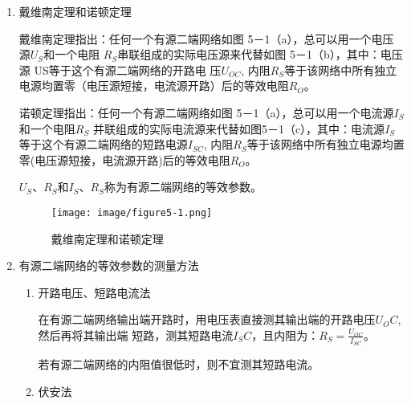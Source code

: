 \documentclass[UTF8]{article}
\begin{document}
            \begin{enumerate}[label=\textbf{\arabic*}.]
                \item 戴维南定理和诺顿定理
                \par
                \noindent\hspace{2em}戴维南定理指出：任何一个有源二端网络如图 5－1（a），总可以用一个电压源$U_S$和一个电阻
                $R_S$串联组成的实际电压源来代替如图 5－1（b），其中：电压源 US等于这个有源二端网络的开路电
                压$U_{OC}$, 内阻$R_S$等于该网络中所有独立电源均置零（电压源短接，电流源开路）后的等效电阻$R_O$。
                \par
                \noindent\hspace{2em}诺顿定理指出：任何一个有源二端网络如图 5－1（a），总可以用一个电流源$I_S$和一个电阻$R_S$
                并联组成的实际电流源来代替如图5－1（c），其中：电流源$I_S$等于这个有源二端网络的短路电源$I_{SC}$, 
                内阻$R_S$等于该网络中所有独立电源均置零(电压源短接，电流源开路)后的等效电阻$R_O$。 
                \par
                \noindent\hspace{2em}$U_S$、$R_S$和$I_S$、$R_S$称为有源二端网络的等效参数。
                \begin{figure}[H]
                    \centering
                    \texttt{[image: image/figure5-1.png]}
                    \caption{戴维南定理和诺顿定理}
                \end{figure}
                \item 有源二端网络的等效参数的测量方法
                \begin{enumerate}[label=(\textbf{\arabic*})]
                    \item 开路电压、短路电流法
                    \par
                    \noindent\hspace{2em}在有源二端网络输出端开路时，用电压表直接测其输出端的开路电压$U_OC$, 然后再将其输出端
                    短路，测其短路电流$I_SC$，且内阻为：$R_S = \frac{U_{OC}}{I_{SC}}$。
                    \par
                    \noindent\hspace{2em}若有源二端网络的内阻值很低时，则不宜测其短路电流。
                    \item 伏安法
                    \begin{adjustwidth}{0em}{0em}
                        \begin{minipage}[H]{0.5\textwidth}

\end{minipage}
\end{adjustwidth}
\end{enumerate}
\end{enumerate}
\end{document}
